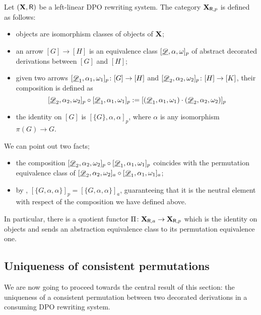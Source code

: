\begin{definition}
Let $(\textbf {\textup{X}}, \mathsf{R})$ be a left-linear DPO rewriting system. The category $\textbf {\textup{X}}_{\mathsf{R}, p}$ is defined as follows: 
	\begin{itemize}
	\item objects are isomorphism classes of objects of $\textbf {\textup{X}}$;
	\item an arrow $[G]\to [H]$ is an equivalence class $[\underline{\mathscr{D}}, \alpha, \omega]_p$ of abstract decorated derivations between $[G]$ and $[H]$;
	\item given two arrows $[\underline{\mathscr{D}}_1, \alpha_1, \omega_1] _p\colon [G]\to [H]$ and $[\underline{\mathscr{D}}_2, \alpha_2, \omega_2] _p\colon [H]\to [K]$, their composition is defined as
	\[[\underline{\mathscr{D}}_2, \alpha_2, \omega_2]_p \circ [\underline{\mathscr{D}}_1, \alpha_1, \omega_1]_p:=[(\underline{\mathscr{D}}_1, \alpha_1, \omega_1) \cdot (\underline{\mathscr{D}}_2, \alpha_2, \omega_2)]_p\] 
	\item the identity on $[G]$ is $[\{G\}, \alpha, \alpha]_p$, where $\alpha$ is any isomorphism $\pi(G)\to G$.	\end{itemize}
\end{definition}
\begin{remark} We can point out two facts;
	\begin{itemize}
		\item the composition 	$[\underline{\mathscr{D}}_2, \alpha_2, \omega_2]_p \circ [\underline{\mathscr{D}}_1, \alpha_1, \omega_1]_p$ coincides with the permutation equivalence class of $	[\underline{\mathscr{D}}_2, \alpha_2, \omega_2]_a \circ [\underline{\mathscr{D}}_1, \alpha_1, \omega_1]_a$;
		\item by , $[\{G, \alpha, \alpha\}]_p=[\{G, \alpha, \alpha\}]_a$, guaranteeing that it is the neutral element with respect of the composition we have defined above.
	\end{itemize}
	
	In particular, there is a quotient functor $\Pi\colon \textbf {\textup{X}}_{\mathsf{R}, a}\to \textbf {\textup{X}}_{\mathsf{R}, p}$ which is the identity on objects and sends an abstraction equivalence class to its permutation equivalence one.
\end{remark}

\subsection{Uniqueness of consistent permutations}

We are now going to proceed towards the central result of this section: the uniqueness of a consistent permutation between two decorated derivations in a consuming DPO rewriting system.
 
